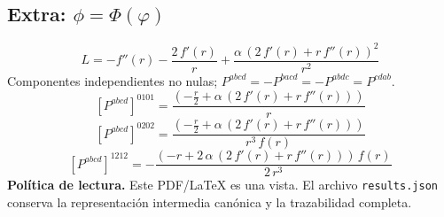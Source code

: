 \documentclass[11pt]{article}
\begin{document}
\subsection*{Extra: $\phi=\Phi\!\left(\varphi\right)$}
\begin{dmath*}[breakdepth={5}]
L=-f''\!\left(r\right) - \frac{2\,f'\!\left(r\right)}{r} + \frac{\alpha\,{\left(2\,f'\!\left(r\right) + r\,f''\!\left(r\right)\right)}^{2}}{{r}^{2}}
\end{dmath*}
Componentes independientes no nulas; $P^{abcd}=-P^{bacd}=-P^{abdc}=P^{cdab}$.
\begin{dmath*}[breakdepth={5}]
\left[P^{abcd}\right]^{0101}=\frac{\left(-\frac{r}{2} + \alpha\,\left(2\,f'\!\left(r\right) + r\,f''\!\left(r\right)\right)\right)}{r}
\end{dmath*}
\begin{dmath*}[breakdepth={5}]
\left[P^{abcd}\right]^{0202}=\frac{\left(-\frac{r}{2} + \alpha\,\left(2\,f'\!\left(r\right) + r\,f''\!\left(r\right)\right)\right)}{{r}^{3}\,f\!\left(r\right)}
\end{dmath*}
\begin{dmath*}[breakdepth={5}]
\left[P^{abcd}\right]^{1212}=-\frac{\left(-r + 2\,\alpha\,\left(2\,f'\!\left(r\right) + r\,f''\!\left(r\right)\right)\right)\,f\!\left(r\right)}{2\,{r}^{3}}
\end{dmath*}
\bigskip\noindent\textbf{Política de lectura.} Este PDF/LaTeX es una vista. El archivo \texttt{results.json} conserva la representación intermedia canónica y la trazabilidad completa.
\end{document}

